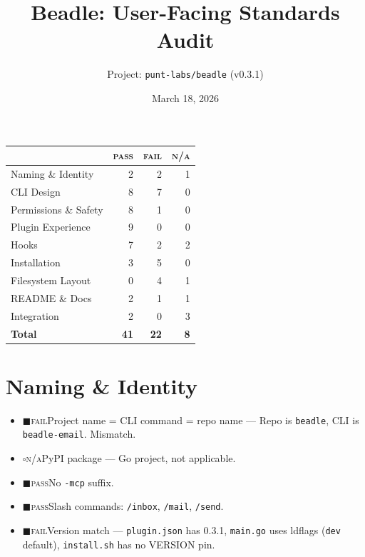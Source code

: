 \documentclass[a4paper,10pt]{article}
\newcommand{\pass}{{\color{green!60!black}$\blacksquare$\hspace{0.4em}\textsc{pass}}\hspace{0.5em}}
\newcommand{\fail}{{\color{red!70!black}$\blacksquare$\hspace{0.4em}\textsc{fail}}\hspace{0.5em}}
\newcommand{\na}{{\color{gray}$\square$\hspace{0.4em}\textsc{n/a}}\hspace{0.5em}}
\begin{document}
\title{Beadle: User-Facing Standards Audit}
\author{Project: \texttt{punt-labs/beadle} (v0.3.1)}
\date{March 18, 2026}
\maketitle

\begin{center}
\begin{tabular}{lrrr}
\toprule
& \textsc{pass} & \textsc{fail} & \textsc{n/a} \\
\midrule
Naming \& Identity    & 2 & 2 & 1 \\
CLI Design            & 8 & 7 & 0 \\
Permissions \& Safety & 8 & 1 & 0 \\
Plugin Experience     & 9 & 0 & 0 \\
Hooks                 & 7 & 2 & 2 \\
Installation          & 3 & 5 & 0 \\
Filesystem Layout     & 0 & 4 & 1 \\
README \& Docs        & 2 & 1 & 1 \\
Integration           & 2 & 0 & 3 \\
\midrule
\textbf{Total}        & \textbf{41} & \textbf{22} & \textbf{8} \\
\bottomrule
\end{tabular}
\end{center}

\tableofcontents
\newpage

% 
\section{Naming \& Identity}

\begin{itemize}
  \item \fail Project name = CLI command = repo name ---
    Repo is \texttt{beadle}, CLI is \texttt{beadle-email}. Mismatch.
  \item \na PyPI package --- Go project, not applicable.
  \item \pass No \texttt{-mcp} suffix.
  \item \pass Slash commands: \texttt{/inbox}, \texttt{/mail}, \texttt{/send}.
  \item \fail Version match --- \texttt{plugin.json} has 0.3.1,
    \texttt{main.go} uses ldflags (\texttt{dev} default),
    \texttt{install.sh} has no VERSION pin.
\end{itemize}
\end{document}
